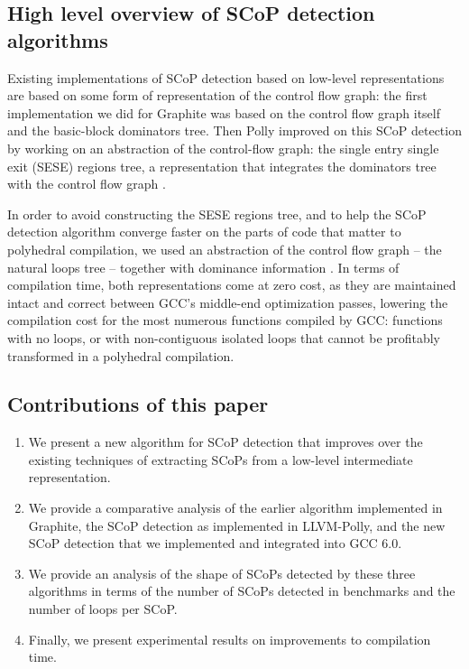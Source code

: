 \documentclass{sig-alternate}
\begin{document}
\subsection{High level overview of SCoP detection algorithms}

Existing implementations of SCoP detection based on low-level representations
are based on some form of representation of the control flow graph: the first
implementation we did for Graphite \cite{graphite} was based on the control flow
graph itself and the basic-block dominators tree.  Then Polly improved on this
SCoP detection \cite{polly} by working on an abstraction of the control-flow
graph: the single entry single exit (SESE) regions tree, a representation that
integrates the dominators tree with the control flow graph \cite{sese}.

In order to avoid constructing the SESE regions tree, and to help the SCoP
detection algorithm converge faster on the parts of code that matter to
polyhedral compilation, we used an abstraction of the control flow graph -- the
natural loops tree \cite{dragonbook} -- together with dominance information
\cite{ramalingam}.  In terms of compilation time, both representations come at
zero cost, as they are maintained intact and correct between GCC's middle-end
optimization passes, lowering the compilation cost for the most numerous
functions compiled by GCC: functions with no loops, or with non-contiguous
isolated loops that cannot be profitably transformed in a polyhedral
compilation.

\subsection{Contributions of this paper}
\begin{enumerate}
  \item We present a new algorithm for SCoP detection that improves over the
    existing techniques of extracting SCoPs from a low-level intermediate
    representation.
  \item We provide a comparative analysis of the earlier algorithm implemented
    in Graphite, the SCoP detection as implemented in LLVM-Polly, and the new
    SCoP detection that we implemented and integrated into GCC 6.0.
  \item We provide an analysis of the shape of SCoPs detected by these three
    algorithms in terms of the number of SCoPs detected in benchmarks and the
    number of loops per SCoP.
  \item Finally, we present experimental results on improvements to compilation
    time.
\end{enumerate}
\end{document}

